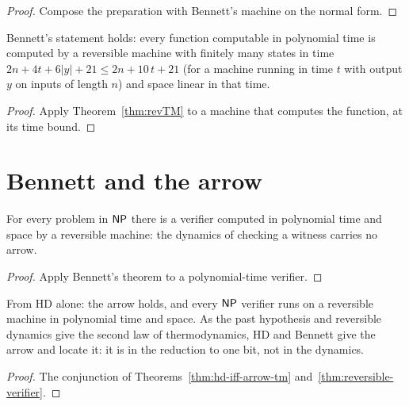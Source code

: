 \begin{proof}
  \leanok
  Compose the preparation with Bennett's machine on the normal form.
\end{proof}

\begin{theorem}
  \label{thm:bennett-holds}
  \leanok
  Bennett's statement holds: every function computable in polynomial time is computed by a
  reversible machine with finitely many states in time $2n + 4t + 6|y| + 21 \le 2n + 10\,t + 21$ (for a
  machine running in time $t$ with output $y$ on inputs of length $n$) and space linear in that
  time.
\end{theorem}

\begin{proof}
  \leanok
  Apply Theorem~\ref{thm:revTM} to a machine that computes the function, at its time bound.
\end{proof}

\section{Bennett and the arrow}

\begin{theorem}
  \label{thm:reversible-verifier}
  \leanok
  For every problem in $\mathsf{NP}$ there is a verifier computed in polynomial time and space by a
  reversible machine: the dynamics of checking a witness carries no arrow.
  \own{}
\end{theorem}

\begin{proof}
  \leanok
  Apply Bennett's theorem to a polynomial-time verifier.
\end{proof}

\begin{theorem}
  \label{thm:decision-bennett}
  \leanok
  From HD alone: the arrow holds, and every $\mathsf{NP}$ verifier runs on a reversible machine in
  polynomial time and space. As the past hypothesis and reversible dynamics give the second law of
  thermodynamics, HD and Bennett give the arrow and locate it: it is in the reduction to one bit, not
  in the dynamics.
  \own{}
\end{theorem}

\begin{proof}
  \leanok
  The conjunction of Theorems~\ref{thm:hd-iff-arrow-tm} and~\ref{thm:reversible-verifier}.
\end{proof}
